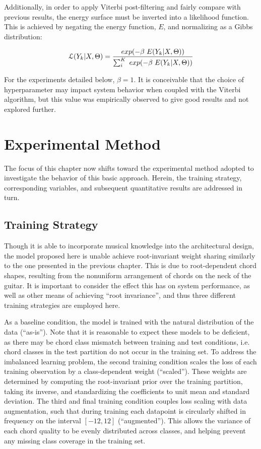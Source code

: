 Additionally, in order to apply Viterbi post-filtering and fairly compare with previous results, the energy surface must be inverted into a likelihood function.
This is achieved by negating the energy function, $E$, and normalizing as a Gibbs distribution:

\begin{equation}
\small
\mathcal{L}(Y_k \vert X, \Theta) = \frac{exp(-\beta~E(Y_k \vert X, \Theta))}{\sum_i^K~exp(-\beta~E(Y_k \vert X, \Theta))}
\end{equation}

For the experiments detailed below, $\beta=1$.
It is conceivable that the choice of hyperparameter may impact system behavior when coupled with the Viterbi algorithm, but this value was empirically observed to give good results and not explored further.


\section{Experimental Method}

The focus of this chapter now shifts toward the experimental method adopted to investigate the behavior of this basic approach.
Herein, the training strategy, corresponding variables, and subsequent quantitative results are addressed in turn.

\subsection{Training Strategy}
\label{subsec:strategy}

Though it is able to incorporate musical knowledge into the architectural design, the model proposed here is unable achieve root-invariant weight sharing similarly to the one presented in the previous chapter.
This is due to root-dependent chord shapes, resulting from the nonuniform arrangement of chords on the neck of the guitar.
It is important to consider the effect this has on system performance, as well as other means of achieving ``root invariance'', and thus three different training strategies are employed here.

As a baseline condition, the model is trained with the natural distribution of the data (``as-is'').
Note that it is reasonable to expect these models to be deficient, as there may be chord class mismatch between training and test conditions, i.e. chord classes in the test partition do not occur in the training set.
To address the imbalanced learning problem, the second training condition scales the loss of each training observation by a class-dependent weight (``scaled'').
These weights are determined by computing the root-invariant prior over the training partition, taking its inverse, and standardizing the coefficients to unit mean and standard deviation.
The third and final training condition couples loss scaling with data augmentation, such that during training each datapoint is circularly shifted in frequency on the interval $[-12, 12]$ (``augmented'').
This allows the variance of each chord quality to be evenly distributed across classes, and helping prevent any missing class coverage in the training set.

